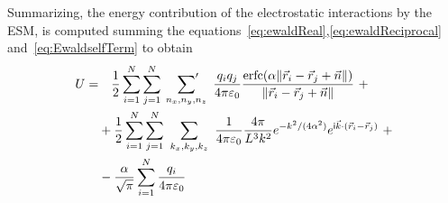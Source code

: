 Summarizing, the energy contribution of the electrostatic interactions by the \ac{ESM}, is computed summing the equations~\eqref{eq:ewaldReal},\eqref{eq:ewaldReciprocal} and~\eqref{eq:EwaldselfTerm} to obtain
\begin{equation}
	\begin{aligned}
		U =&\quad\frac{1}{2}\sum_{i=1}^N\sum_{j=1}^N\ \sideset{}{'}\sum_{n_x,n_y,n_z}\ \frac{q_iq_j}{4 \pi \varepsilon_0} \frac{\erfc{(\alpha \| \vec r_i - \vec r_j + \vec n \|)}}{\| \vec r_i - \vec r_j + \vec n \|}\ + \\
		 &+ \frac{1}{2}\sum_{i=1}^N\sum_{j=1}^N\ \sum_{k_x,k_y,k_z}\  \frac{1}{4\pi\varepsilon_0}\frac{4\pi}{L^3k^2}e^{-k^2/(4\alpha^2)}e^{\mathsf{i}{\vec k \cdot (\vec r_i - \vec r_j)}}\ + \\
		 &- \frac{\alpha}{\sqrt{\pi}}\sum_{i=1}^N\frac{q_i}{4\pi\varepsilon_0}
	\end{aligned}
	\label{eq:EwaldEnergy}
\end{equation}
